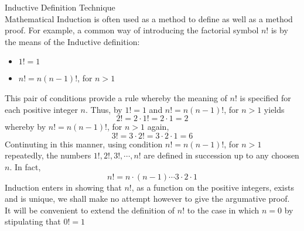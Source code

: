 \begin{definition}
Inductive Definition Technique \\

Mathematical Induction is often used as a method to define as well as a method proof. For example, a common way of introducing the factorial symbol $n!$ is by the means of the Inductive definition: 
    \begin{itemize}
        \item $1! = 1$
        \item $n! = n(n-1)!$, for $n > 1$
    \end{itemize}
This pair of conditions provide a rule whereby the meaning of $n!$ is specified for each positive integer $n$. Thus, by $1! = 1$ and $n! = n(n-1)!$, for $n > 1$ yields
    \begin{equation*}
        2! = 2 \cdot 1 ! = 2 \cdot 1 = 2
    \end{equation*}
whereby by $n! = n(n-1)!$, for $n > 1$ again, 
    \begin{equation*}
        3! = 3 \cdot 2 ! = 3 \cdot 2 \cdot 1 = 6
    \end{equation*}
Continuting in this manner, using condition $n! = n(n-1)!$, for $n > 1$ repeatedly, the numbers $1!, 2!, 3!,\cdots, n!$ are defined in succession up to any choosen $n$. In fact, 
    \begin{equation*}
        n! = n \cdot (n-1) \cdots 3 \cdot 2 \cdot 1
    \end{equation*}
Induction enters in showing that $n!$, as a function on the positive integers, exists and is unique, we shall make no attempt however to give the argumative proof. \\

It will be convenient to extend the definition of $n!$ to the case in which $n=0$ by stipulating that $0! = 1$
\end{definition}

